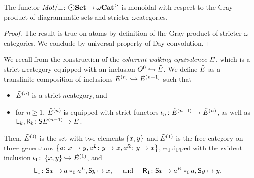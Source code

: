 \begin{lem} \label{lem:molecin_monoidal}
    The functor \( \molecin{-} \colon \dgmSet \to \somegaCat \) is monoidal with respect to the Gray product of diagrammatic sets and stricter \( \omega \)\nbd categories.
\end{lem}
\begin{proof}
    The result is true on atoms by definition of the Gray product of stricter \( \omega \)\nbd categories.
    We conclude by universal property of Day convolution.
\end{proof}

\begin{dfn} \label{dfn:strict_walking_equivalence}
    We recall from \cite{hadzihasanovic2024model} the construction of the \emph{coherent walking equivalence \( \tilde E \)}, which is a strict \( \omega \)\nbd category equipped with an inclusion \( O^{0} \hookrightarrow \tilde E \).
    We define \( \tilde E \) as a transfinite composition of inclusions \( \tilde E^{(n)} \hookrightarrow \tilde E^{(n + 1)} \) such that
    \begin{itemize}
        \item \( \tilde E^{(n)} \) is a strict \( n \)\nbd category, and
        \item for \( n \geq 1 \), \( \tilde E^{(n)} \) is equipped with strict functors \( \iota_n \colon \tilde E^{(n - 1)} \to \tilde E^{(n)} \),
    as well as \( \mathsf{L}_k, \mathsf{R}_k \colon \mathsf{S}{\tilde E^{(n - 1)}} \to \tilde E \).
    \end{itemize}
    Then, \( \tilde E^{(0)} \) is the set with two elements \( \left\{ {x, y} \right\} \) and \( \tilde E^{(1)} \) is the free category on three generators \( \left\{ {a \colon x \to y, a^L \colon y \to x, a^R \colon y \to x} \right\} \), equipped with the evident inclusion \( \iota_1 \colon \left\{ {x, y} \right\} \hookrightarrow \tilde E^{(1)} \), and
    \begin{equation*}
        \mathsf{L}_1 \colon \mathsf{S}{x} \mapsto a *_{0} a^L, \mathsf{S}{y} \mapsto x, \quad\text{ and }\quad \mathsf{R}_1 \colon \mathsf{S}{x} \mapsto a^R *_{0} a, \mathsf{S}{y} \mapsto y.
    \end{equation*}


\end{dfn}
